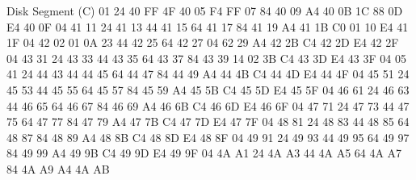 \documentclass{article}
\begin{document}
\begin{hexlsting}
        Disk Segment (C)
        01 24 40 FF 4F 40 05 F4 FF 07 84 40 09 A4 40 0B
        1C 88 0D E4 40 0F 04 41 11 24 41 13 44 41 15 64
        41 17 84 41 19 A4 41 1B C0 01 10 E4 41 1F 04 42
        02 01 0A 23 44 42 25 64 42 27 04 62 29 A4 42 2B
        C4 42 2D E4 42 2F 04 43 31 24 43 33 44 43 35 64
        43 37 84 43 39 14 02 3B C4 43 3D E4 43 3F 04 05
        41 24 44 43 44 44 45 64 44 47 84 44 49 A4 44 4B
        C4 44 4D E4 44 4F 04 45 51 24 45 53 44 45 55 64
        45 57 84 45 59 A4 45 5B C4 45 5D E4 45 5F 04 46
        61 24 46 63 44 46 65 64 46 67 84 46 69 A4 46 6B
        C4 46 6D E4 46 6F 04 47 71 24 47 73 44 47 75 64
        47 77 84 47 79 A4 47 7B C4 47 7D E4 47 7F 04 48
        81 24 48 83 44 48 85 64 48 87 84 48 89 A4 48 8B
        C4 48 8D E4 48 8F 04 49 91 24 49 93 44 49 95 64
        49 97 84 49 99 A4 49 9B C4 49 9D E4 49 9F 04 4A
        A1 24 4A A3 44 4A A5 64 4A A7 84 4A A9 A4 4A AB
    \end{hexlsting}
\end{document}
